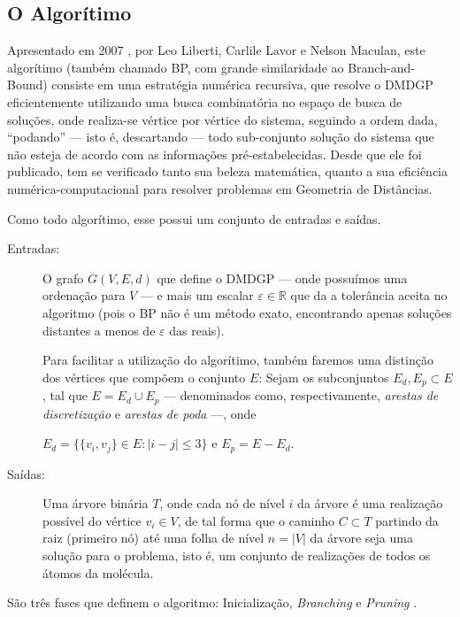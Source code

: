 \documentclass[a4paper,12pt]{article}
\begin{document}
	\subsection{O Algorítimo}
	Apresentado em 2007 \cite{carlile:BP}, por Leo Liberti, Carlile Lavor e Nelson Maculan, este algorítimo (também chamado BP, com grande similaridade ao Branch-and-Bound) consiste em uma estratégia numérica recursiva, que resolve o DMDGP eficientemente utilizando uma busca combinatória no espaço de busca de soluções, onde realiza-se vértice por vértice do sistema, seguindo a ordem dada, ``podando'' --- isto é, descartando --- todo sub-conjunto solução do sistema que não esteja de acordo com as informações pré-estabelecidas. Desde que ele foi publicado, tem se verificado tanto sua beleza matemática, quanto a sua eficiência numérica-computacional para resolver problemas em Geometria de Distâncias.
	
	Como todo algorítimo, esse possui um conjunto de entradas e saídas.
	\begin{description}
		\item[Entradas:] O grafo $G(V, E, d)$ que define o DMDGP --- onde possuímos uma ordenação para $V$ --- e mais um escalar $\varepsilon \in \mathbb{R}$ que da a tolerância aceita no algoritmo (pois o BP não é um método exato, encontrando apenas soluções distantes a menos de $\varepsilon$ das reais).
		
		Para facilitar a utilização do algorítimo, também faremos uma distinção dos vértices que compõem o conjunto $E$: Sejam os subconjuntos $E_{d}, E_p \subset E$, tal que $E = E_{d} \cup E_{p}$ --- denominados como, respectivamente, \textit{arestas de discretização} e \textit{arestas de poda} ---, onde
		
		\begin{center}
			$E_{d} = \{\{v_i,v_j\} \in E : |i-j|\leq 3\}$ e $E_{p} = E - E_d$.
		\end{center}
		
		\item[Saídas:] Uma árvore binária $T$, onde cada nó de nível $i$ da árvore é uma realização possível do vértice $v_i \in V$, de tal forma que o caminho $C \subset T$ partindo da raiz (primeiro nó) até uma folha de nível $n = |V|$ da árvore seja uma solução para o problema, isto é, um conjunto de realizações de todos os átomos da molécula.
	\end{description}

	São três fases que definem o algoritmo: Inicialização, \textit{Branching} e \textit{Pruning} \cite{fidalgotese}.
		
\end{document}
